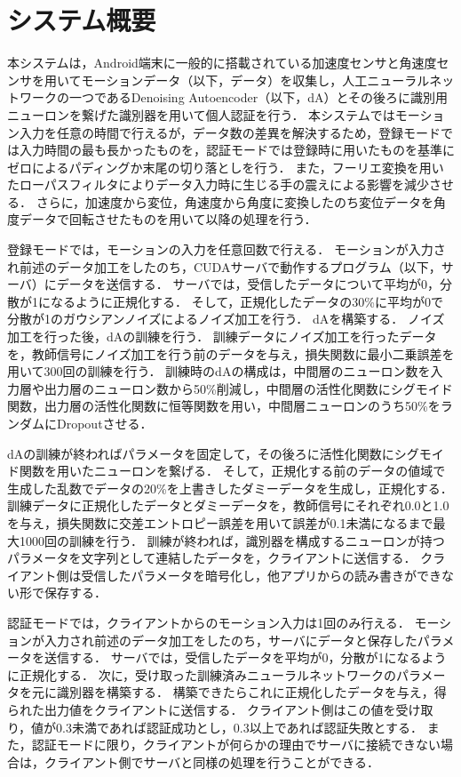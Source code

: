 \section{システム概要}
本システムは，Android端末に一般的に搭載されている加速度センサと角速度センサを用いてモーションデータ（以下，データ）を収集し，人工ニューラルネットワークの一つであるDenoising Autoencoder（以下，dA）とその後ろに識別用ニューロンを繋げた識別器を用いて個人認証を行う．
本システムではモーション入力を任意の時間で行えるが，データ数の差異を解決するため，登録モードでは入力時間の最も長かったものを，認証モードでは登録時に用いたものを基準にゼロによるパディングか末尾の切り落としを行う．
また，フーリエ変換を用いたローパスフィルタによりデータ入力時に生じる手の震えによる影響を減少させる．
さらに，加速度から変位，角速度から角度に変換したのち変位データを角度データで回転させたものを用いて以降の処理を行う．

登録モードでは，モーションの入力を任意回数で行える．
モーションが入力され前述のデータ加工をしたのち，CUDAサーバで動作するプログラム（以下，サーバ）にデータを送信する．
サーバでは，受信したデータについて平均が0，分散が1になるように正規化する．
そして，正規化したデータの30\%に平均が0で分散が1のガウシアンノイズによるノイズ加工を行う．
dAを構築する．
ノイズ加工を行った後，dAの訓練を行う．
訓練データにノイズ加工を行ったデータを，教師信号にノイズ加工を行う前のデータを与え，損失関数に最小二乗誤差を用いて300回の訓練を行う．
訓練時のdAの構成は，中間層のニューロン数を入力層や出力層のニューロン数から50\%削減し，中間層の活性化関数にシグモイド関数，出力層の活性化関数に恒等関数を用い，中間層ニューロンのうち50\%をランダムにDropoutさせる．

dAの訓練が終わればパラメータを固定して，その後ろに活性化関数にシグモイド関数を用いたニューロンを繋げる．
そして，正規化する前のデータの値域で生成した乱数でデータの20\%を上書きしたダミーデータを生成し，正規化する．
訓練データに正規化したデータとダミーデータを，教師信号にそれぞれ0.0と1.0を与え，損失関数に交差エントロピー誤差を用いて誤差が0.1未満になるまで最大1000回の訓練を行う．
訓練が終われば，識別器を構成するニューロンが持つパラメータを文字列として連結したデータを，クライアントに送信する．
クライアント側は受信したパラメータを暗号化し，他アプリからの読み書きができない形で保存する．

認証モードでは，クライアントからのモーション入力は1回のみ行える．
モーションが入力され前述のデータ加工をしたのち，サーバにデータと保存したパラメータを送信する．
サーバでは，受信したデータを平均が0，分散が1になるように正規化する．
次に，受け取った訓練済みニューラルネットワークのパラメータを元に識別器を構築する．
構築できたらこれに正規化したデータを与え，得られた出力値をクライアントに送信する．
クライアント側はこの値を受け取り，値が0.3未満であれば認証成功とし，0.3以上であれば認証失敗とする．
また，認証モードに限り，クライアントが何らかの理由でサーバに接続できない場合は，クライアント側でサーバと同様の処理を行うことができる．
